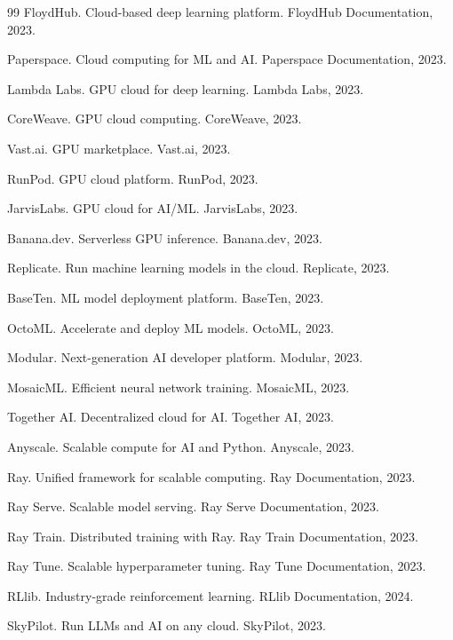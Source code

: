 \documentclass[12pt,a4paper]{ctexart}
\begin{document}
\begin{thebibliography}{99}
 FloydHub. Cloud-based deep learning platform. FloydHub Documentation, 2023.

 Paperspace. Cloud computing for ML and AI. Paperspace Documentation, 2023.

 Lambda Labs. GPU cloud for deep learning. Lambda Labs, 2023.

 CoreWeave. GPU cloud computing. CoreWeave, 2023.

 Vast.ai. GPU marketplace. Vast.ai, 2023.

 RunPod. GPU cloud platform. RunPod, 2023.

 JarvisLabs. GPU cloud for AI/ML. JarvisLabs, 2023.

 Banana.dev. Serverless GPU inference. Banana.dev, 2023.

 Replicate. Run machine learning models in the cloud. Replicate, 2023.

 BaseTen. ML model deployment platform. BaseTen, 2023.

 OctoML. Accelerate and deploy ML models. OctoML, 2023.

 Modular. Next-generation AI developer platform. Modular, 2023.

 MosaicML. Efficient neural network training. MosaicML, 2023.

 Together AI. Decentralized cloud for AI. Together AI, 2023.

 Anyscale. Scalable compute for AI and Python. Anyscale, 2023.

 Ray. Unified framework for scalable computing. Ray Documentation, 2023.

 Ray Serve. Scalable model serving. Ray Serve Documentation, 2023.

 Ray Train. Distributed training with Ray. Ray Train Documentation, 2023.

 Ray Tune. Scalable hyperparameter tuning. Ray Tune Documentation, 2023.

 RLlib. Industry-grade reinforcement learning. RLlib Documentation, 2024.

 SkyPilot. Run LLMs and AI on any cloud. SkyPilot, 2023.


\end{thebibliography}
\end{document}
